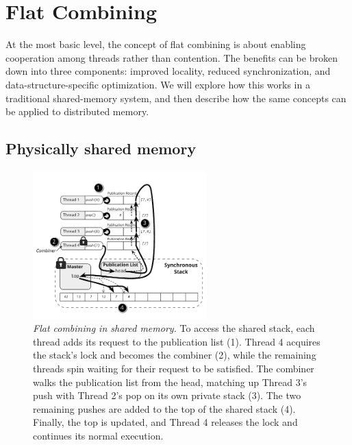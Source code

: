 \section{Flat Combining}

At the most basic level, the concept of flat combining is about enabling cooperation among threads rather than contention. The benefits can be broken down into three components: improved locality, reduced synchronization, and data-structure-specific optimization. We will explore how this works in a traditional shared-memory system, and then describe how the same concepts can be applied to distributed memory.


\subsection{Physically shared memory}

\begin{figure}[t]
  \centering
  \includegraphics[width=0.6\textwidth]{figs/fc_shared_mem.pdf}
  \caption{\emph{Flat combining in shared memory.}
    To access the shared stack, each thread adds its request to the publication list (1). Thread 4 acquires the stack's lock and becomes the combiner (2), while the remaining threads spin waiting for their request to be satisfied. The combiner walks the publication list from the head, matching up Thread 3's push with Thread 2's pop on its own private stack (3). The two remaining pushes are added to the top of the shared stack (4). Finally, the top is updated, and Thread 4 releases the lock and continues its normal execution.
  }
  \label{fig:fc_shared_mem}
\end{figure}

